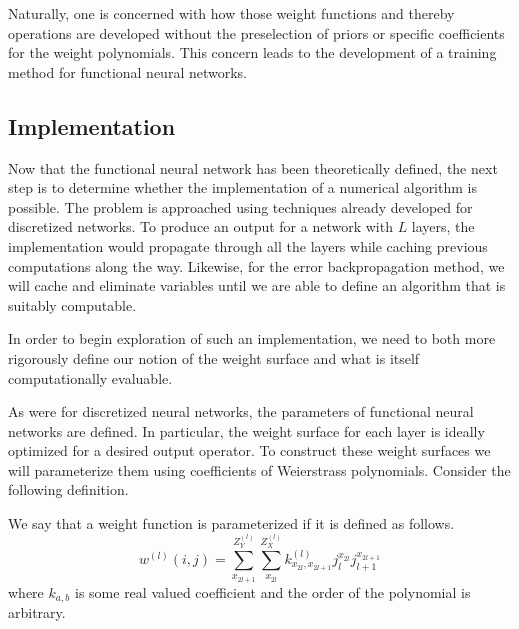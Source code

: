 Naturally, one is concerned with how those weight functions and thereby operations are developed without the preselection of priors or specific coefficients for the weight polynomials. This concern leads to the development of a training method for functional neural networks.

























\subsection{Implementation}
Now that the functional neural network has been theoretically defined, the next step is to determine whether the implementation of a numerical algorithm is possible. The problem is approached using techniques already developed for discretized networks. To produce an output for a network with $L$ layers, the implementation would propagate through all the layers while caching previous computations along the way. Likewise, for the error backpropagation method, we will cache and eliminate variables until we are able to define an algorithm that is suitably computable. 

In order to begin exploration of such an implementation, we need to both more rigorously define our notion of the weight surface and what is itself computationally evaluable.


As were for discretized neural networks, the parameters of functional neural networks are defined. In particular, the weight surface for each layer is ideally optimized for a desired output operator. To construct these weight surfaces we will parameterize them using  coefficients of Weierstrass polynomials. Consider the following definition.
\begin{definition} We say that a weight function is parameterized if it is defined as follows.
\begin{equation}
w^{(l)}(i,j) = 
    \sum_{x_{2l+1}}^{Z^{(l)}_Y} \sum_{x_{2l}}^{Z^{(l)}_X} k^{(l)}_{x_{2l},x_{2l+1}}j_{l}^{x_{2l}}j_{l+1}^{x_{2l+1}}
\end{equation}
where $k_{a,b}$ is some real valued coefficient and the order of the polynomial is arbitrary.
\end{definition}

